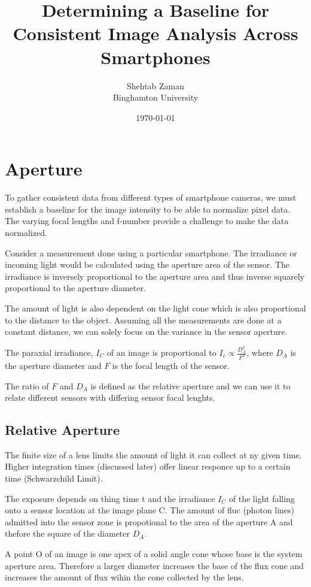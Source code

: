 \documentclass{article}
\title{Determining a Baseline for Consistent Image Analysis Across Smartphones}
\author{Shehtab Zaman \\ Binghamton University}
\date{\today}
\begin{document}
\maketitle
\section{Aperture}

To gather consistent data from different types of smartphone cameras, we must establish
a baseline for the image intensity to be able to normalize pixel data. The varying focal lengths and
f-number provide a challenge to make the data normalized.

Consider a measurement done using a particular smartphone. The irradiance
or incoming light would be calculated using the aperture area of the sensor.
The irradiance is inversely proportional to the aperture area and thus inverse
squarely proportional to the aperture diameter.

The amount of light is also dependent on the light cone which is also
proportional to the distance to the object. Assuming all the measurements are
done at a constant distance, we can solely focus on the variance in the
sensor aperture.

The paraxial irradiance, $ I_C$ of an image is proportional to $I_c \propto \frac{D^2_A}{F^2} $,
where $ D_A$ is the aperture diameter and $ F$ is the focal length of the sensor.

The ratio of $ F$ and $ D_A$ is defined as the relative aperture and we can use it
to relate different sensors with differing sensor focal lenghts.

\subsection{Relative Aperture}

The finite size of a lens limits the amount of light it can collect at ny given time.
Higher integration times (discussed later) offer linear responce up to a certain
time (Schwarzchild Limit).

The exposure depends on thing time t and the irradiance $ I_C$
of the light falling onto a sensor location at the image plane C.
The amount of fluc (photon lines) admitted into the sensor zone is propotional
to the area of the aperture A and thefore the square of the diameter $ D_A$.

A point O of an image is one apex
of a solid angle cone whose base is the system aperture area. Therefore a larger
diameter increases the base of the flux cone and increases the amount of flux wihin the cone
collected by the lens.
\end{document}
